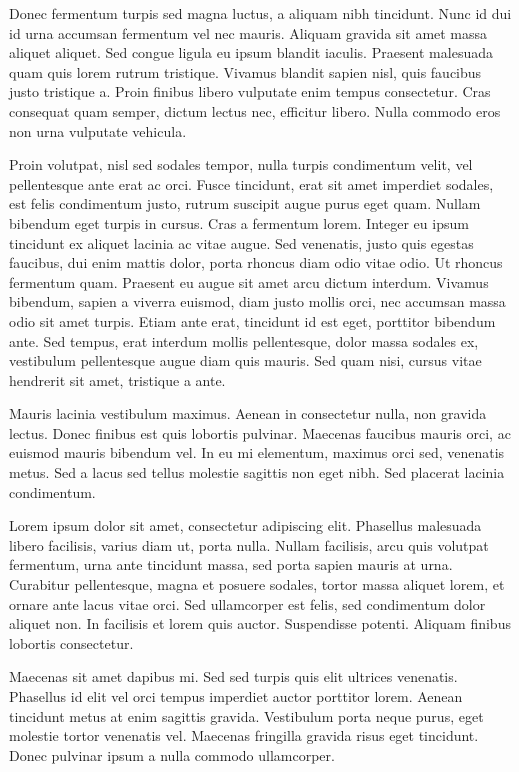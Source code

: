 \documentclass{article}
\begin{document}
Donec fermentum turpis sed magna luctus, a aliquam nibh tincidunt. Nunc id dui id urna accumsan fermentum vel nec mauris. Aliquam gravida sit amet massa aliquet aliquet. Sed congue ligula eu ipsum blandit iaculis. Praesent malesuada quam quis lorem rutrum tristique. Vivamus blandit sapien nisl, quis faucibus justo tristique a. Proin finibus libero vulputate enim tempus consectetur. Cras consequat quam semper, dictum lectus nec, efficitur libero. Nulla commodo eros non urna vulputate vehicula.


Proin volutpat, nisl sed sodales tempor, nulla turpis condimentum velit, vel pellentesque ante erat ac orci. Fusce tincidunt, erat sit amet imperdiet sodales, est felis condimentum justo, rutrum suscipit augue purus eget quam. Nullam bibendum eget turpis in cursus. Cras a fermentum lorem. Integer eu ipsum tincidunt ex aliquet lacinia ac vitae augue. Sed venenatis, justo quis egestas faucibus, dui enim mattis dolor, porta rhoncus diam odio vitae odio. Ut rhoncus fermentum quam. Praesent eu augue sit amet arcu dictum interdum. Vivamus bibendum, sapien a viverra euismod, diam justo mollis orci, nec accumsan massa odio sit amet turpis. Etiam ante erat, tincidunt id est eget, porttitor bibendum ante. Sed tempus, erat interdum mollis pellentesque, dolor massa sodales ex, vestibulum pellentesque augue diam quis mauris. Sed quam nisi, cursus vitae hendrerit sit amet, tristique a ante.


Mauris lacinia vestibulum maximus. Aenean in consectetur nulla, non gravida lectus. Donec finibus est quis lobortis pulvinar. Maecenas faucibus mauris orci, ac euismod mauris bibendum vel. In eu mi elementum, maximus orci sed, venenatis metus. Sed a lacus sed tellus molestie sagittis non eget nibh. Sed placerat lacinia condimentum.

Lorem ipsum dolor sit amet, consectetur adipiscing elit. Phasellus malesuada libero facilisis, varius diam ut, porta nulla. Nullam facilisis, arcu quis volutpat fermentum, urna ante tincidunt massa, sed porta sapien mauris at urna. Curabitur pellentesque, magna et posuere sodales, tortor massa aliquet lorem, et ornare ante lacus vitae orci. Sed ullamcorper est felis, sed condimentum dolor aliquet non. In facilisis et lorem quis auctor. Suspendisse potenti. Aliquam finibus lobortis consectetur.

Maecenas sit amet dapibus mi. Sed sed turpis quis elit ultrices venenatis. Phasellus id elit vel orci tempus imperdiet auctor porttitor lorem. Aenean tincidunt metus at enim sagittis gravida. Vestibulum porta neque purus, eget molestie tortor venenatis vel. Maecenas fringilla gravida risus eget tincidunt. Donec pulvinar ipsum a nulla commodo ullamcorper.
\end{document}
